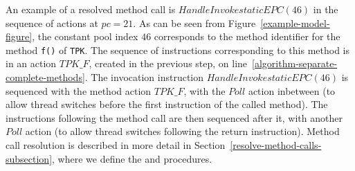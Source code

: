 An example of a resolved method call is $HandleInvokestaticEPC(46)$ in
the sequence of actions at $pc = 21$.
As can be seen from Figure~\ref{example-model-figure}, the constant
pool index $46$ corresponds to the method identifier for the method
\texttt{f()} of \texttt{TPK}.
The sequence of instructions corresponding to this method is in an
action $TPK\_F$, created in the previous step, on
line~\ref{algorithm-separate-complete-methods}.
The invocation instruction $HandleInvokestaticEPC(46)$ is sequenced
with the method action $TPK\_F$, with the $Poll$ action inbetween (to
allow thread switches before the first instruction of the called
method).
The instructions following the method call are then sequenced after
it, with another $Poll$ action (to allow thread switches following the
return instruction).
Method call resolution is described in more detail in
Section~\ref{resolve-method-calls-subsection}, where we define the
 and 
procedures.

